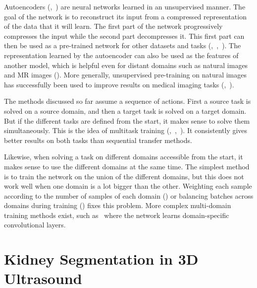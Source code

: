 Autoencoders (\textcite{ballard1987},~\textcite{bengio2007NIPS}) are neural networks learned in an unsupervised manner. The goal of the network is to reconstruct its input from a compressed representation of the data that it will learn. The first part of the network progressively compresses the input while the second part decompresses it. This first part can then be used as a pre-trained network for other datasets and tasks (\textcite{bengio2007NIPS},~\textcite{vincent2008ICML},~\textcite{erhan2010JMLR}). The representation learned by the autoencoder can also be used as the features of another model, which is helpful even for distant domains such as natural images and MR images (\textcite{gupta2013ICML}). More generally, unsupervised pre-training on natural images has successfully been used to improve results on medical imaging tasks (\textcite{schlegl2014MICCAI},~\textcite{hofmanninger2015CVPR}).

The methods discussed so far assume a sequence of actions. First a source task is solved on a source domain, and then a target task is solved on a target domain. But if the different tasks are defined from the start, it makes sense to solve them simultaneously. This is the idea of multitask training (\textcite{caruana1995NIPS},~\textcite{caruana1997},~\textcite{collobert2008ICML}). It consistently gives better results on both tasks than sequential transfer methods. 

Likewise, when solving a task on different domains accessible from the start, it makes sense to use the different domains at the same time. The simplest method is to train the network on the union of the different domains, but this does not work well when one domain is a lot bigger than the other. Weighting each sample according to the number of samples of each domain (\textcite{daume2007}) or balancing batches across domains during training (\textcite{buda2017}) fixes this problem. More complex multi-domain training methods exist, such as~\textcite{nam2016CVPR} where the network learns domain-specific convolutional layers.





\section{Kidney Segmentation in 3D Ultrasound}
\label{sec:kidney}

